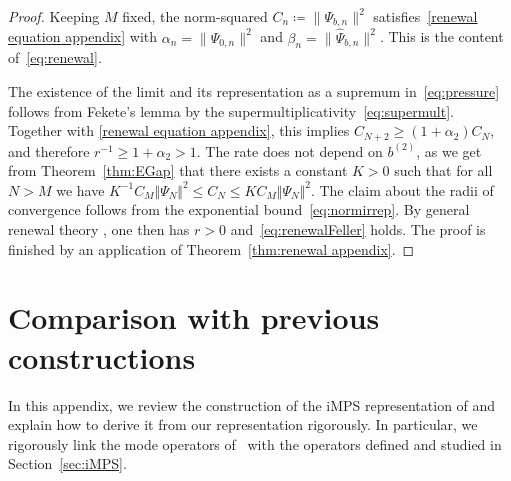 \documentclass[letterpaper, DIV=17]{scrartcl}
\numberwithin{equation}{section}
\theoremstyle{definition}
\begin{document}
		\begin{proof}
		Keeping $ M $ fixed,  the norm-squared $ C_n \coloneqq \| \Psi_{b,n} \|^2 $ satisfies~\eqref{renewal equation appendix} 
		with $ \alpha_n = \| \widehat \Psi_{0,n} \|^2 $ and $ \beta_n = \| \widehat \Psi_{b,n} \|^2 $. This is the content of~\eqref{eq:renewal}. 
		
		The existence of the limit and its representation as a supremum in~\eqref{eq:pressure} follows from  Fekete's lemma by the supermultiplicativity~\eqref{eq:supermult}. 
		Together with \eqref{renewal equation appendix},  this implies $C_{N+2} \geq (1+\alpha_2)C_N$, and therefore $r^{-1}\geq 1+\alpha_2>1.$ The rate does not depend on $b^{(2)}$, as we get from Theorem~\ref{thm:EGap} that there exists a constant $K>0$ such that for all $N>M$ we have $K^{-1}C_M \Vert \Psi_N\Vert^2 \leq C_N \leq K C_M \Vert \Psi_N\Vert^2$. The claim about the radii of convergence follows from the exponential bound~\eqref{eq:normirrep}. 
		By general renewal theory  \cite[XIII, Theorem 1]{feller1968introduction}, one then has $ r > 0 $ and~\eqref{eq:renewalFeller} holds. The proof is finished by an application of Theorem~\ref{thm:renewal appendix}. 
		\end{proof}
		
		
			
		\section{Comparison with previous constructions} \label{app:B}
		
		In this appendix, we review the construction of the iMPS representation of \cite{estienne2013fractional} and explain how to derive it from our representation rigorously. In particular, we rigorously link the mode operators of~\cite{estienne2013fractional} with the operators defined and studied in Section~\ref{sec:iMPS}. 
		
\end{document}
